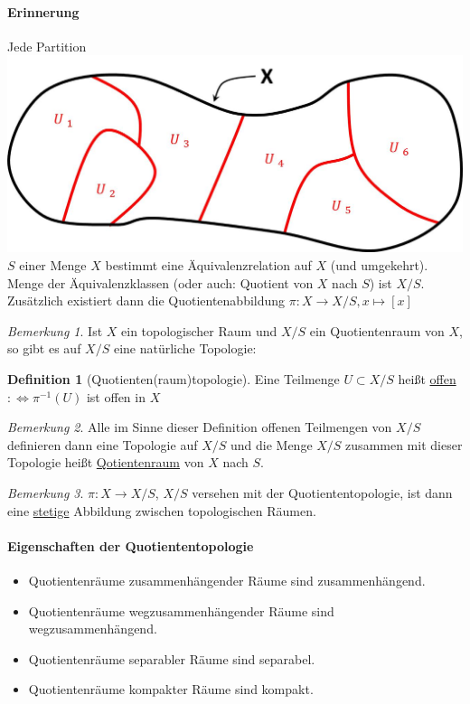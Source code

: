 \documentclass[a4paper,11pt,notitlepage]{report}
\theoremstyle{remark}
\newtheorem{remark}{Bemerkung}[chapter]
\theoremstyle{definition}
\newtheorem{definition}{Definition}[chapter]
\begin{document}
\paragraph{Erinnerung} Jede Partition \includegraphics[scale=0.2]{images/Partition.jpg} $S$ einer Menge $X$ bestimmt eine Äquivalenzrelation auf $X$ (und umgekehrt).
\newline
Menge der Äquivalenzklassen (oder auch: Quotient von $X$ nach $S$) ist $X/S$.
Zusätzlich existiert dann die Quotientenabbildung $\pi \colon X \rightarrow X/S, x \mapsto [x]$ 

\begin{remark}
	Ist $X$ ein topologischer Raum und $X/S$ ein Quotientenraum von $X$, so gibt es auf $X/S$ eine natürliche Topologie:
\end{remark}

\begin{definition}[Quotienten(raum)topologie]
	Eine Teilmenge $U \subset X/S$ heißt \underline{offen}
	$:\Leftrightarrow \pi^{-1}(U)$ ist offen in $X$
\end{definition}
 
\begin{remark}
	Alle im Sinne dieser Definition offenen Teilmengen von $X/S$ definieren dann eine Topologie auf $X/S$ und die Menge $X/S$ zusammen mit dieser Topologie heißt \underline{Qotienten\underline{raum}} von $X$ nach $S$.
\end{remark}

\begin{remark}
	$\pi \colon X \rightarrow X/S$, $X/S$ versehen mit der Quotiententopologie, ist dann eine  \underline{stetige} Abbildung zwischen topologischen Räumen.
\end{remark}

\paragraph{Eigenschaften der Quotiententopologie}
\begin{itemize}
	\item Quotientenräume zusammenhängender Räume sind zusammenhängend.
	\item Quotientenräume wegzusammenhängender Räume sind wegzusammenhängend.
	\item Quotientenräume separabler Räume sind separabel.
	\item Quotientenräume kompakter Räume sind kompakt.
\end{itemize}
\end{document}
